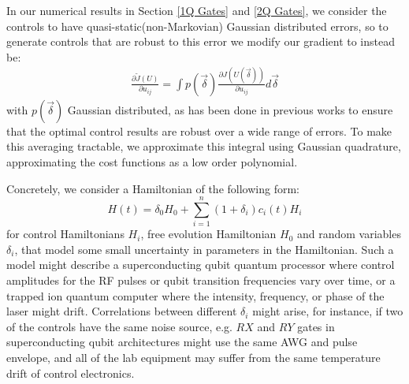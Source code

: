 \documentclass[aps,nofootinbib,pra,notitlepage,twocolumn]{revtex4-1}
\begin{document}
In our numerical results in Section \ref{1Q Gates} and \ref{2Q Gates}, we consider the controls to have quasi-static\cite{Ball2016}(non-Markovian) Gaussian distributed errors, so to generate controls that are robust to this error we modify our gradient to instead be:
\begin{align}\label{quadrature}
\frac{\partial \tilde J(U)}{\partial u_{ij}} =
\int p(\vec{\delta})\frac{\partial J(U(\vec{\delta}))}{\partial u_{ij}} d\vec{\delta}
\end{align}
with $p(\vec{\delta})$ Gaussian distributed, as has been done in previous works \cite{Goerz2014} to ensure that the optimal control results are robust over a wide range of errors. To make this averaging tractable, we approximate this integral using Gaussian quadrature, approximating the cost functions as a low order polynomial\cite{abramowiz1972handbook}. 

Concretely, we consider a Hamiltonian of the following form:
\begin{equation}\label{eq:2}
  H(t) = \delta_0H_0 + \sum_{i=1}^n (1 + \delta_i)c_i(t)H_i
\end{equation}
for control Hamiltonians $H_i$, free evolution Hamiltonian $H_0$ and random variables $\delta_i$, that model some small uncertainty in parameters in the Hamiltonian. Such a model might describe a superconducting qubit quantum processor where control amplitudes for the RF pulses or qubit transition frequencies vary over time, or a trapped ion quantum computer where the intensity, frequency, or phase of the laser might drift\cite{Kelly2018, Klimov2018, Lekitsch2017}. Correlations between different $\delta_i$ might arise, for instance, if two of the controls have the same noise source, e.g. $RX$ and $RY$ gates in superconducting qubit architectures might use the same AWG and pulse envelope, and all of the lab equipment may suffer from the same temperature drift of control electronics.
\end{document}
